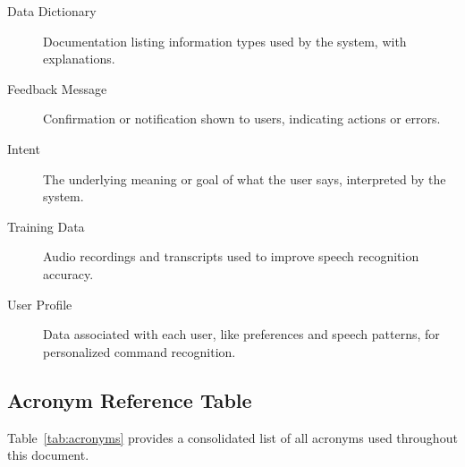 \documentclass[11pt]{article}
\begin{document}
\begin{description}
  \item[Data Dictionary] Documentation listing information types used by the system, with explanations.
  \item[Feedback Message] Confirmation or notification shown to users, indicating actions or errors.
  \item[Intent] The underlying meaning or goal of what the user says, interpreted by the system.
  \item[Training Data] Audio recordings and transcripts used to improve speech recognition accuracy.
  \item[User Profile] Data associated with each user, like preferences and speech patterns, for personalized command recognition.
\end{description}

\subsection*{Acronym  Reference Table}


Table~\ref{tab:acronyms} provides a consolidated list of all acronyms used throughout this document.
\end{document}
